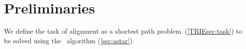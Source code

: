 \section{Preliminaries} \label{sec:prereq}

We define the task of alignment as a shortest path problem~(\cref{TRIEsec:task}) to
be solved using the \A~algorithm (\cref{sec:astar}).
%


